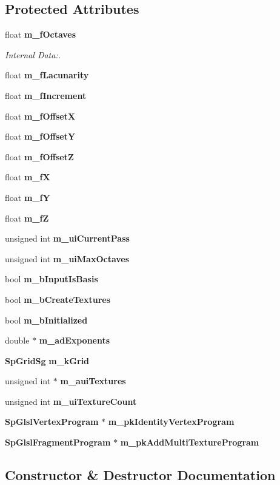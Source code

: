 \subsection*{Protected Attributes}
\begin{CompactItemize}
\item 
float {\bf m\_\-f\-Octaves}
\begin{CompactList}\small\item\em Internal Data:. \item\end{CompactList}\item 
float {\bf m\_\-f\-Lacunarity}
\item 
float {\bf m\_\-f\-Increment}
\item 
float {\bf m\_\-f\-Offset\-X}
\item 
float {\bf m\_\-f\-Offset\-Y}
\item 
float {\bf m\_\-f\-Offset\-Z}
\item 
float {\bf m\_\-f\-X}
\item 
float {\bf m\_\-f\-Y}
\item 
float {\bf m\_\-f\-Z}
\item 
unsigned int {\bf m\_\-ui\-Current\-Pass}
\item 
unsigned int {\bf m\_\-ui\-Max\-Octaves}
\item 
bool {\bf m\_\-b\-Input\-Is\-Basis}
\item 
bool {\bf m\_\-b\-Create\-Textures}
\item 
bool {\bf m\_\-b\-Initialized}
\item 
double $\ast$ {\bf m\_\-ad\-Exponents}
\item 
{\bf Sp\-Grid\-Sg} {\bf m\_\-k\-Grid}
\item 
unsigned int $\ast$ {\bf m\_\-aui\-Textures}
\item 
unsigned int {\bf m\_\-ui\-Texture\-Count}
\item 
{\bf Sp\-Glsl\-Vertex\-Program} $\ast$ {\bf m\_\-pk\-Identity\-Vertex\-Program}
\item 
{\bf Sp\-Glsl\-Fragment\-Program} $\ast$ {\bf m\_\-pk\-Add\-Multi\-Texture\-Program}
\end{CompactItemize}


\subsection{Constructor \& Destructor Documentation}
